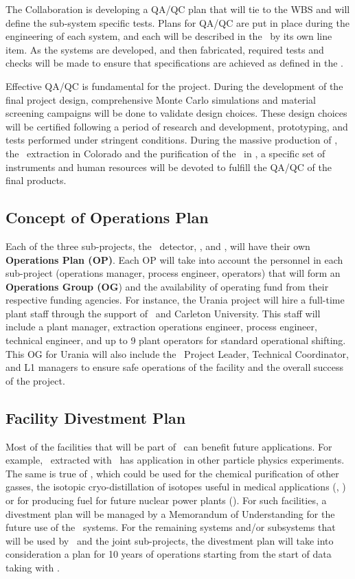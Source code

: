 The Collaboration is developing a QA/QC plan that will tie to the WBS and will define the sub-system specific tests. Plans for QA/QC are put in place during the engineering of each system, and each will be described in the \WBS\ by its own line item.  As the systems are developed, and then fabricated, required tests and checks will be made to ensure that specifications are achieved as defined in the \WBS.

Effective QA/QC is fundamental for the project.  During the development of the final project design, comprehensive Monte Carlo simulations and material screening campaigns will be done to validate design choices. These design choices will be certified following a period of research and development, prototyping, and tests performed under stringent conditions.  During the massive production of \DSkPdms, the \UAr\ extraction in Colorado and the purification of the \UAr\ in \Aria, a specific set of instruments and human resources will be devoted to fulfill the QA/QC of the final products.


\subsection{Concept of Operations Plan}

Each of the three sub-projects, the \DSks\ detector, \Urania, and \Aria, will have their own {\bf Operations Plan (OP)}.  Each OP will take into account the personnel in each sub-project (operations manager, process engineer, operators) that will form an {\bf Operations Group (OG}) and the availability of operating fund from their respective funding agencies. For instance, the Urania project will hire a full-time plant staff through the support of \PNNL\ and Carleton University. This staff will include a plant manager, extraction operations engineer, process engineer, technical engineer, and up to \num{9} plant operators for standard operational shifting.  This OG for Urania will also include the \Urania\ Project Leader, Technical Coordinator, and L1 managers to ensure safe operations of the facility and the overall success of the project.


\subsection{Facility Divestment Plan}

Most of the facilities that will be part of \DSk\ can benefit future applications.  For example, \UAr\ extracted with \Urania\ has application in other particle physics experiments.  The same is true of \Aria, which could be used for the chemical purification of other gasses, the isotopic cryo-distillation of isotopes useful in medical applications (, ) or for producing fuel for future nuclear power plants ().  For such facilities, a divestment plan will be managed by a Memorandum of Understanding for the future use of the \DSks\ systems.  For the remaining systems and/or subsystems that will be used by \DSks\ and the joint sub-projects, the divestment plan will take into consideration a plan for 10 years of operations starting from the start of data taking with \DSk.